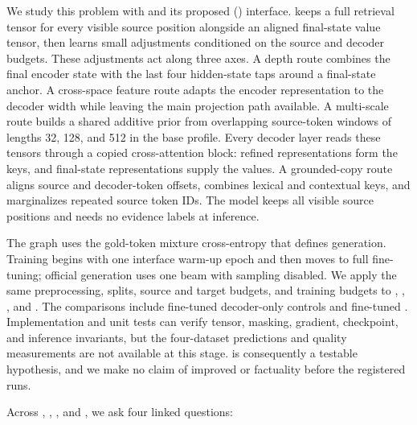 We study this problem with \EviSeq and its proposed \AFMRFull{} (\AFMR) interface. \AFMR keeps a full retrieval tensor for every visible source position alongside an aligned final-state value tensor, then learns small adjustments conditioned on the source and decoder budgets. These adjustments act along three axes. A depth route combines the final encoder state with the last four hidden-state taps around a final-state anchor. A cross-space feature route adapts the encoder representation to the decoder width while leaving the main projection path available. A multi-scale route builds a shared additive prior from overlapping source-token windows of lengths 32, 128, and 512 in the base profile. Every decoder layer reads these tensors through a copied cross-attention block: refined representations form the keys, and final-state representations supply the values. A grounded-copy route aligns source and decoder-token offsets, combines lexical and contextual keys, and marginalizes repeated source token IDs. The model keeps all visible source positions and needs no evidence labels at inference.

The graph uses the gold-token mixture cross-entropy that defines generation. Training begins with one interface warm-up epoch and then moves to full fine-tuning; official generation uses one beam with sampling disabled. We apply the same preprocessing, splits, source and target budgets, and training budgets to \PubMed, \ArXiv, \BookSum, and \GovReport. The comparisons include fine-tuned decoder-only controls and fine-tuned \TfiveGemma. Implementation and unit tests can verify tensor, masking, gradient, checkpoint, and inference invariants, but the four-dataset predictions and quality measurements are not available at this stage. \AFMR is consequently a testable hypothesis, and we make no claim of improved \Rouge or factuality before the registered runs.

Across \PubMed, \ArXiv, \BookSum, and \GovReport, we ask four linked questions:

